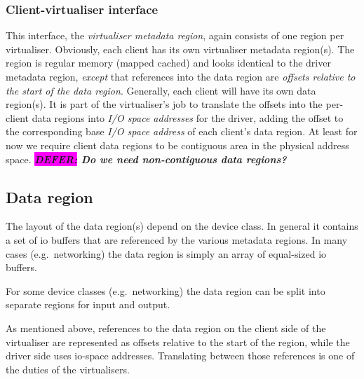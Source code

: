 \documentclass[a4paper,12pt]{report}
\newcommand{\DEFER}[1]{\textbf{\textsl{\colorbox{magenta}{DEFER:} #1}}}
\newcommand{\DEFER}[1]{\relax}
\begin{document}
\subsubsection{Client-virtualiser interface}

This interface, the \emph{virtualiser metadata region}, again consists
of one region per virtualiser. Obviously, each client has its own
virtualiser metadata region(s). The region is
regular memory (mapped cached) and looks identical to the
driver metadata region, \emph{except} that references into the data region are
\emph{offsets relative to the start of the data region}.  Generally,
each client will have its own data region(s). It is part of
the virtualiser's job to translate the offsets into the per-client
data regions into \emph{I/O space
  addresses} for the driver, adding the offset to the corresponding
base \emph{I/O space address} of each client's data
region. At least for now we require client data regions to be
contiguous area in the physical address space.
\DEFER{Do we need non-contiguous data regions?}


\subsection{Data region}\label{s:buf-states}

The layout of the data region(s) depend on the device class. In general
it contains a set of \gls{io} buffers that are referenced by the various
metadata regions. In many cases (e.g.\
networking) the data region is simply an array of equal-sized \gls{io}
buffers.

For some device classes (e.g.\ networking) the data region can be split
into separate regions for input and output.

As mentioned above, references to the data region on the client side
of the virtualiser are represented as offsets relative to the start of
the region, while the driver side uses
\gls{io}-space addresses. Translating between those references is one of
the duties of the virtualisers.
\end{document}
